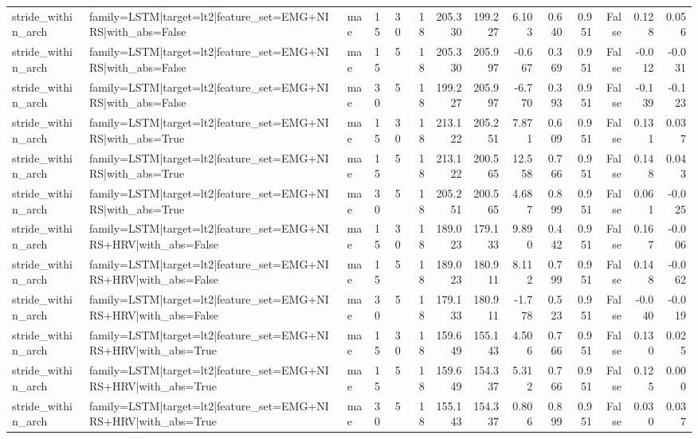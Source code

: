 \begin{table}
\begin{tabular}{lllllrrrrrrrrr}
stride_within_arch & family=LSTM|target=lt2|feature_set=EMG+NIRS|with_abs=False & mae & 15 & 30 & 18 & 205.330 & 199.227 & 6.103 & 0.640 & 0.951 & False & 0.128 & 0.056 \\
stride_within_arch & family=LSTM|target=lt2|feature_set=EMG+NIRS|with_abs=False & mae & 15 & 5 & 18 & 205.330 & 205.997 & -0.667 & 0.369 & 0.951 & False & -0.012 & -0.031 \\
stride_within_arch & family=LSTM|target=lt2|feature_set=EMG+NIRS|with_abs=False & mae & 30 & 5 & 18 & 199.227 & 205.997 & -6.770 & 0.393 & 0.951 & False & -0.139 & -0.123 \\
stride_within_arch & family=LSTM|target=lt2|feature_set=EMG+NIRS|with_abs=True & mae & 15 & 30 & 18 & 213.122 & 205.251 & 7.871 & 0.609 & 0.951 & False & 0.131 & 0.037 \\
stride_within_arch & family=LSTM|target=lt2|feature_set=EMG+NIRS|with_abs=True & mae & 15 & 5 & 18 & 213.122 & 200.565 & 12.558 & 0.766 & 0.951 & False & 0.148 & 0.043 \\
stride_within_arch & family=LSTM|target=lt2|feature_set=EMG+NIRS|with_abs=True & mae & 30 & 5 & 18 & 205.251 & 200.565 & 4.687 & 0.899 & 0.951 & False & 0.061 & -0.025 \\
stride_within_arch & family=LSTM|target=lt2|feature_set=EMG+NIRS+HRV|with_abs=False & mae & 15 & 30 & 18 & 189.023 & 179.133 & 9.890 & 0.442 & 0.951 & False & 0.167 & -0.006 \\
stride_within_arch & family=LSTM|target=lt2|feature_set=EMG+NIRS+HRV|with_abs=False & mae & 15 & 5 & 18 & 189.023 & 180.911 & 8.112 & 0.799 & 0.951 & False & 0.148 & -0.062 \\
stride_within_arch & family=LSTM|target=lt2|feature_set=EMG+NIRS+HRV|with_abs=False & mae & 30 & 5 & 18 & 179.133 & 180.911 & -1.778 & 0.523 & 0.951 & False & -0.040 & -0.019 \\
stride_within_arch & family=LSTM|target=lt2|feature_set=EMG+NIRS+HRV|with_abs=True & mae & 15 & 30 & 18 & 159.649 & 155.143 & 4.506 & 0.766 & 0.951 & False & 0.130 & 0.025 \\
stride_within_arch & family=LSTM|target=lt2|feature_set=EMG+NIRS+HRV|with_abs=True & mae & 15 & 5 & 18 & 159.649 & 154.337 & 5.312 & 0.766 & 0.951 & False & 0.125 & 0.000 \\
stride_within_arch & family=LSTM|target=lt2|feature_set=EMG+NIRS+HRV|with_abs=True & mae & 30 & 5 & 18 & 155.143 & 154.337 & 0.806 & 0.899 & 0.951 & False & 0.030 & 0.037 \\
\bottomrule
\end{tabular}
\end{table}
